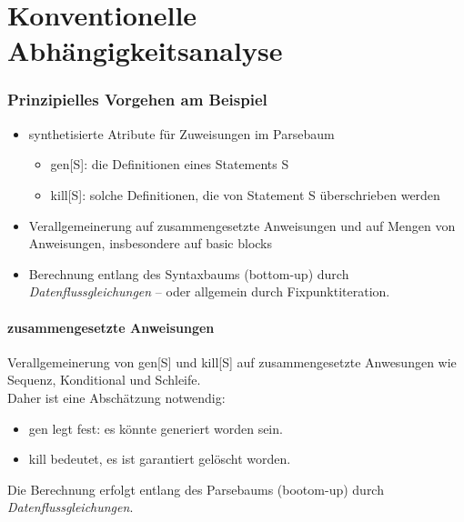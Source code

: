 \section{Konventionelle Abhängigkeitsanalyse} %
\label{sec:konventionelle_abhaengigkeitsanalyse}
\subsubsection{Prinzipielles Vorgehen am Beispiel} %
\label{ssub:prinzipielles_vorgehen_am_beispiel}

\begin{itemize}
    \item synthetisierte Atribute für Zuweisungen im Parsebaum
    \begin{itemize}
        \item gen[S]: die Definitionen eines Statements S
        \item kill[S]: solche Definitionen, die von Statement S überschrieben werden
    \end{itemize}
    \item Verallgemeinerung auf zusammengesetzte Anweisungen und auf Mengen von Anweisungen, insbesondere auf \glqq basic blocks\grqq
    \item Berechnung entlang des Syntaxbaums (bottom-up) durch \emph{Datenflussgleichungen} -- oder allgemein durch Fixpunktiteration.
\end{itemize}



\paragraph{zusammengesetzte Anweisungen} %
\label{par:zusammengesetzte_anweisungen}
Verallgemeinerung von gen[S] und kill[S] auf zusammengesetzte Anwesungen wie Sequenz, Konditional und Schleife.\\
Daher ist eine Abschätzung notwendig:
\begin{itemize}
    \item gen legt fest: es könnte generiert worden sein.
    \item kill bedeutet, es ist garantiert gelöscht worden.
\end{itemize}

Die Berechnung erfolgt entlang des Parsebaums (bootom-up) durch \emph{Datenflussgleichungen}.


